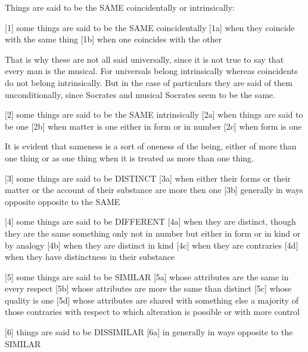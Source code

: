 
Things are said to be the SAME coincidentally or intrinsically:

[1]     some things are said to be the SAME coincidentally
[1a]    when they coincide with the same thing
[1b]    when one coincides with the other

        That is why these are not all said universally,
        since it is not true to say that every man is the musical.
        For universals belong intrinsically whereas coincidents do not belong intrinsically.
        But in the case of particulars they are said of them unconditionally,
        since Socrates and musical Socrates seem to be the same.

[2]     some things are said to be the SAME intrinsically
[2a]    when things are said to be one
[2b]    when matter is one either in form or in number
[2c]    when form is one

        It is evident that sameness is a sort of oneness of the being,
        either of more than one thing or as one thing when it is treated as
        more than one thing.

[3]     some things are said to be DISTINCT
[3a]    when either their forms or their matter or
        the account of their substance are more then one
[3b]    generally in ways opposite opposite to the SAME

[4]     some things are said to be DIFFERENT
[4a]    when they are distinct, though they are the same something
        only not in number but either in form or in kind or by analogy
[4b]    when they are distinct in kind
[4c]    when they are contraries
[4d]    when they have distinctness in their substance

[5]     some things are said to be SIMILAR
[5a]    whose attributes are the same in every respect
[5b]    whose attributes are more the same than distinct
[5c]    whose quality is one
[5d]    whose attributes are shared with something else
        a majority of those contraries with respect to which
        alteration is possible or with more control

[6]     things are said to be DISSIMILAR
[6a]    in generally in ways opposite to the SIMILAR
